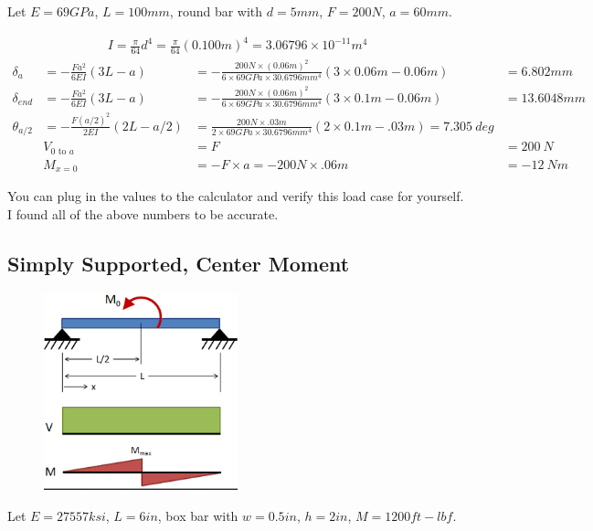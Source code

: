 \documentclass[10pt,letterpaper]{article}
\begin{document}
	Let $E = 69 GPa$, $L = 100 mm$, round bar with $d = 5 mm$, $F = 200 N$, $a = 60mm$.

	\begin{align}
		I = \frac{\pi}{64} d^4 = \frac{\pi}{64} (0.100 m)^4 = 3.06796 \times 10^{-11} m^4
	\end{align}
	\begin{align}
		\delta_{a} &= - \frac{F a^2}{6 E I} (3 L - a) &= - \frac{200 N \times (0.06 m)^2}{6 \times 69 GPa \times 30.6796 mm^4} (3 \times 0.06 m - 0.06 m) &= 6.802 mm\\
		\delta_{end} &= - \frac{F a^2}{6 E I} (3 L - a) &= - \frac{200 N \times (0.06 m)^2}{6 \times 69 GPa \times 30.6796 mm^4} (3 \times 0.1 m - 0.06 m) &= 13.6048 mm\\
		\theta_{a/2} &= - \frac{F (a/2)^2}{2 E I} (2 L - a/2) &= \frac{200 N \times .03 m}{2 \times 69 GPa \times 30.6796 mm^4} (2 \times 0.1m - .03m) = 7.305 \ deg\\
		& V_{0 \mbox{ to } a} &= F &= 200 \ N \\
		& M_{x=0} &= -F \times a = - 200 N \times .06 m &= - 12\ Nm
	\end{align}

	You can plug in the values to the calculator and verify this load case for yourself. I found all of the above numbers to be accurate.

	\subsection{Simply Supported, Center Moment}

	\begin{figure}[H]
		\includegraphics[width=0.5\textwidth]{beam_case2_schematic.png}
	\end{figure}

	Let $E = 27557 ksi$, $L = 6 in$, box bar with $w = 0.5 in$, $h = 2in$, $M = 1200 ft-lbf$.
\end{document}
